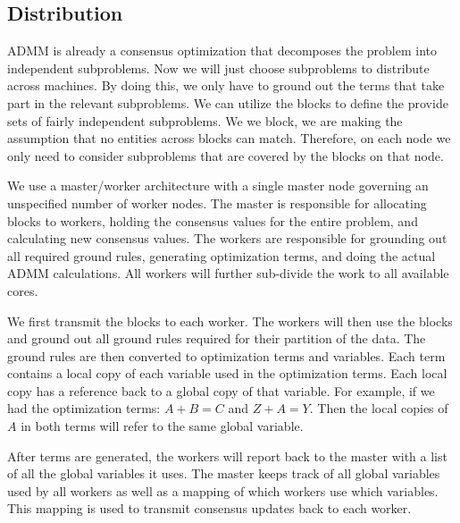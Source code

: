 \documentclass{article}
\begin{document}
    
    
    
    \subsection{Distribution}
        
        ADMM is already a consensus optimization that decomposes the problem into independent subproblems.
        Now we will just choose subproblems to distribute across machines.
        By doing this, we only have to ground out the terms that take part in the relevant subproblems.
        We can utilize the blocks to define the provide sets of fairly independent subproblems.
        We we block, we are making the assumption that no entities across blocks can match.
        Therefore, on each node we only need to consider subproblems that are covered by the blocks on that node.
        
        We use a master/worker architecture with a single master node governing an unspecified number of worker nodes.
        The master is responsible for allocating blocks to workers, holding the consensus values for the entire problem, and calculating new consensus values.
        The workers are responsible for grounding out all required ground rules, generating optimization terms, and doing the actual ADMM calculations.
        All workers will further sub-divide the work to all available cores.
        
        We first transmit the blocks to each worker.
        The workers will then use the blocks and ground out all ground rules required for their partition of the data.
        The ground rules are then converted to optimization terms and variables.
        Each term contains a local copy of each variable used in the optimization terms.
        Each local copy has a reference back to a global copy of that variable.
        For example, if we had the optimization terms: $ A + B = C $ and $ Z + A = Y $.
        Then the local copies of $ A $ in both terms will refer to the same global variable.
        
        After terms are generated, the workers will report back to the master with a list of all the global variables it uses.
        The master keeps track of all global variables used by all workers as well as a mapping of which workers use which variables.
        This mapping is used to transmit consensus updates back to each worker.
        
\end{document}
